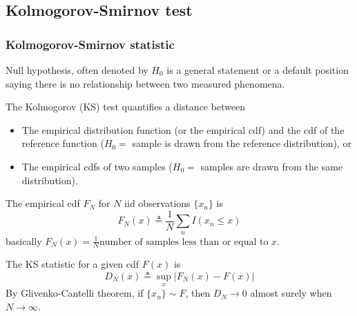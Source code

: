 \subsection{Kolmogorov-Smirnov test}
\subsubsection{Kolmogorov-Smirnov statistic}
Null hypothesis, often denoted by $H_0$ is a general statement or a default position saying there is no relationship between two measured phenomena. 

The Kolmogorov (KS) test quantifies a distance between
\begin{itemize}
	\item The empirical distribution function (or the empirical cdf) and the cdf of the reference function ($H_0 = $ sample is drawn from the reference distribution), or
	\item The empirical cdfs of two samples ($H_0 = $ samples are drawn from the same distribution).
\end{itemize}

The empirical cdf $F_N$ for $N$ iid observations $\{x_n\}$ is
\begin{equation}
	F_N(x) \triangleq \frac{1}{N} \sum_n I(x_n \leq x)
\end{equation}
basically $F_N(x) = \frac{1}{N} \text{number of samples less than or equal to } x$.

The KS statistic for a given cdf $F(x)$ is
\begin{equation}
	D_N(x) \triangleq \sup_x \left|F_N(x) - F(x)\right|
\end{equation}
By Glivenko-Cantelli theorem, if $\{x_n\} \sim F$, then $D_N \to 0$ almost surely when $N \to \infty$.